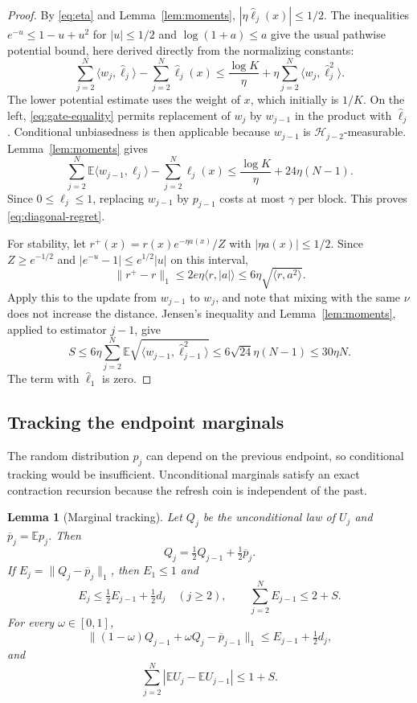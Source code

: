 \documentclass[11pt]{article}
\newtheorem{lemma}[theorem]{Lemma}
\theoremstyle{definition}
\newcommand{\E}{\mathbb E}
\newcommand{\la}{\langle}
\newcommand{\ra}{\rangle}
\begin{document}
\begin{proof}
By \eqref{eq:eta} and Lemma~\ref{lem:moments}, $|\eta\widehat\ell_j(x)|\leq1/2$. The inequalities $e^{-u}\leq1-u+u^2$ for $|u|\leq1/2$ and $\log(1+a)\leq a$ give the usual pathwise potential bound, here derived directly from the normalizing constants:
\[
 \sum_{j=2}^N\la w_j,\widehat\ell_j\ra
 -\sum_{j=2}^N\widehat\ell_j(x)
 \leq\frac{\log K}{\eta}
       +\eta\sum_{j=2}^N\la w_j,\widehat\ell_j^2\ra.
\]
The lower potential estimate uses the weight of $x$, which initially is $1/K$. On the left, \eqref{eq:gate-equality} permits replacement of $w_j$ by $w_{j-1}$ in the product with $\widehat\ell_j$. Conditional unbiasedness is then applicable because $w_{j-1}$ is $\mathcal H_{j-2}$-measurable. Lemma~\ref{lem:moments} gives
\[
 \sum_{j=2}^N\E\la w_{j-1},\ell_j\ra-\sum_{j=2}^N\ell_j(x)
 \leq\frac{\log K}{\eta}+24\eta(N-1).
\]
Since $0\leq\ell_j\leq1$, replacing $w_{j-1}$ by $p_{j-1}$ costs at most $\gamma$ per block. This proves \eqref{eq:diagonal-regret}.

For stability, let $r^+(x)=r(x)e^{-\eta a(x)}/Z$ with $|\eta a(x)|\leq1/2$. Since $Z\geq e^{-1/2}$ and $|e^{-u}-1|\leq e^{1/2}|u|$ on this interval,
\[
 \|r^+-r\|_1
 \leq2e\eta\la r,|a|\ra
 \leq6\eta\sqrt{\la r,a^2\ra}.
\]
Apply this to the update from $w_{j-1}$ to $w_j$, and note that mixing with the same $\nu$ does not increase the distance. Jensen's inequality and Lemma~\ref{lem:moments}, applied to estimator $j-1$, give
\[
 S\leq6\eta\sum_{j=2}^N
        \E\sqrt{\la w_{j-1},\widehat\ell_{j-1}^2\ra}
 \leq6\sqrt{24}\eta(N-1)\leq30\eta N.
\]
The term with $\widehat\ell_1$ is zero.
\end{proof}

\subsection{Tracking the endpoint marginals}

The random distribution $p_j$ can depend on the previous endpoint, so conditional tracking would be insufficient. Unconditional marginals satisfy an exact contraction recursion because the refresh coin is independent of the past.

\begin{lemma}[Marginal tracking]\label{lem:tracking}
Let $Q_j$ be the unconditional law of $U_j$ and $\overline p_j=\E p_j$. Then
\[
 Q_j=\tfrac12Q_{j-1}+\tfrac12\overline p_j.
\]
If $E_j=\|Q_j-\overline p_j\|_1$, then $E_1\leq1$ and
\[
 E_j\leq\tfrac12E_{j-1}+\tfrac12d_j\quad(j\geq2),
 \qquad
 \sum_{j=2}^N E_{j-1}\leq2+S.
\]
For every $\omega\in[0,1]$,
\begin{equation}\label{eq:marginal-mix}
 \|(1-\omega)Q_{j-1}+\omega Q_j-\overline p_{j-1}\|_1
 \leq E_{j-1}+\tfrac12d_j,
\end{equation}
and
\begin{equation}\label{eq:mean-movement}
 \sum_{j=2}^N|\E U_j-\E U_{j-1}|\leq1+S.
\end{equation}
\end{lemma}
\end{document}
